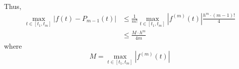Thus, \begin{align*}
    \max_{t \in [t_1, t_m]} | f(t) - P_{m-1}(t) |
     & \leq \frac{1}{m!} \max_{t \in [t_1, t_m]} | f^{(m)}(t) | \frac{h^m \cdot (m - 1)!}{4}
    \\
     & \leq \frac{M \cdot h^m}{4m}
\end{align*} where \[
    M = \max_{t \in [t_1, t_m]} | f^{(m)}(t) |
\]